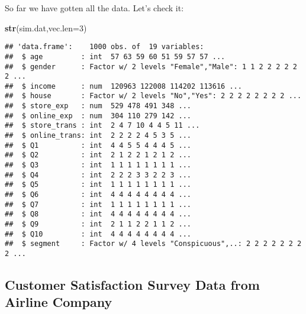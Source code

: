 \documentclass[
]{article}
\newenvironment{Shaded}{\begin{snugshade}}{\end{snugshade}}
\newcommand{\DataTypeTok}[1]{\textcolor[rgb]{0.13,0.29,0.53}{#1}}
\newcommand{\DecValTok}[1]{\textcolor[rgb]{0.00,0.00,0.81}{#1}}
\newcommand{\KeywordTok}[1]{\textcolor[rgb]{0.13,0.29,0.53}{\textbf{#1}}}
\newcommand{\NormalTok}[1]{#1}
\newcommand{\OperatorTok}[1]{\textcolor[rgb]{0.81,0.36,0.00}{\textbf{#1}}}
\newcommand{\StringTok}[1]{\textcolor[rgb]{0.31,0.60,0.02}{#1}}
\begin{document}
\begin{Shaded}
\end{Shaded}

So far we have gotten all the data. Let's check it:

\begin{Shaded}
\begin{Highlighting}[]
\KeywordTok{str}\NormalTok{(sim.dat,}\DataTypeTok{vec.len=}\DecValTok{3}\NormalTok{)}
\end{Highlighting}
\end{Shaded}

\begin{verbatim}
## 'data.frame':    1000 obs. of  19 variables:
##  $ age         : int  57 63 59 60 51 59 57 57 ...
##  $ gender      : Factor w/ 2 levels "Female","Male": 1 1 2 2 2 2 2 2 ...
##  $ income      : num  120963 122008 114202 113616 ...
##  $ house       : Factor w/ 2 levels "No","Yes": 2 2 2 2 2 2 2 2 ...
##  $ store_exp   : num  529 478 491 348 ...
##  $ online_exp  : num  304 110 279 142 ...
##  $ store_trans : int  2 4 7 10 4 4 5 11 ...
##  $ online_trans: int  2 2 2 2 4 5 3 5 ...
##  $ Q1          : int  4 4 5 5 4 4 4 5 ...
##  $ Q2          : int  2 1 2 2 1 2 1 2 ...
##  $ Q3          : int  1 1 1 1 1 1 1 1 ...
##  $ Q4          : int  2 2 2 3 3 2 2 3 ...
##  $ Q5          : int  1 1 1 1 1 1 1 1 ...
##  $ Q6          : int  4 4 4 4 4 4 4 4 ...
##  $ Q7          : int  1 1 1 1 1 1 1 1 ...
##  $ Q8          : int  4 4 4 4 4 4 4 4 ...
##  $ Q9          : int  2 1 1 2 2 1 1 2 ...
##  $ Q10         : int  4 4 4 4 4 4 4 4 ...
##  $ segment     : Factor w/ 4 levels "Conspicuous",..: 2 2 2 2 2 2 2 2 ...
\end{verbatim}

\hypertarget{customer-satisfaction-survey-data-from-airline-company}{%
\subsection{Customer Satisfaction Survey Data from Airline
Company}\label{customer-satisfaction-survey-data-from-airline-company}}
\end{document}
